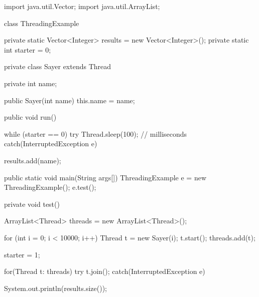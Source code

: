 \begin{JavaCode}
import java.util.Vector;
import java.util.ArrayList;

class ThreadingExample {
    private static Vector<Integer> results = new Vector<Integer>();
    private static int starter = 0;

    private class Sayer extends Thread {
        private int name;

        public Sayer(int name) {
            this.name = name;
        }

        public void run() {
            while (starter == 0) {
                try { Thread.sleep(100); } // milliseconds
                catch(InterruptedException e) { }
            }

            results.add(name);
        }
    }

    public static void main(String args[]) {
        ThreadingExample e = new ThreadingExample();
        e.test();
    }

    private void test() {
        ArrayList<Thread> threads = new ArrayList<Thread>();

        for (int i = 0; i < 10000; i++) {
            Thread t = new Sayer(i);
            t.start();
            threads.add(t);
        }

        starter = 1;

        for(Thread t: threads)
            try { t.join(); }
            catch(InterruptedException e) { }

        System.out.println(results.size());
    }
}
\end{JavaCode}
